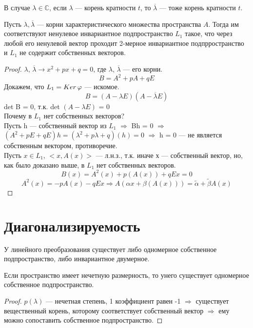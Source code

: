 В случае $\lambda \in \mathbb{C}$, если $\lambda$ --- корень кратности $t$, то $\overline{\lambda}$ --- тоже корень кратности $t$.

\begin{theorem}
    Пусть $\lambda, \overline{\lambda}$ --- корни характеристического множества пространства $A$. Тогда им соответствуют ненулевое инвариантное подпространство $L_1$ такое, что через любой его ненулевой вектор проходит 2-мерное инвариантное подпрространство и $L_1$ не содержит собственных векторов.
\end{theorem}
\begin{proof}
$\lambda$, $\overline{\lambda} \longrightarrow x^2 + px + q = 0$, где $\lambda$, $\overline{\lambda}$ --- его корни.\\
\[
B = A^2 + pA + qE
\]
Докажем, что $L_1 = Ker\thinspace\phi$ --- искомое.\\
\[
B = (A - \lambda E)(A - \overline{\lambda}E)
\]
det B = 0, т.к. det $(A - \lambda E)$ = 0\\
Почему в $L_1$ нет собственных векторов?\\
Пусть h --- собственный вектор из $L_1$ $\Longrightarrow$ Bh = 0 $\Longrightarrow$ $(A^2 + pE + qE)h = (\lambda^2 + p\lambda + q)(h) = 0$ $\Longrightarrow$ h = 0 --- не является собственным вектором, противоречие.\\
Пусть $x \in L_1$, $<x, A(x)>$ --- л.н.з., т.к. иначе х --- собственный вектор, но, как было доказано выше, в $L_1$ нет собственных векторов.
\[
B(x) = A^2(x) + p(A(x)) + qEx = 0
\]
\[
A^2(x) = -pA(x) - qEx \Longrightarrow A(\alpha x + \beta (A(x))) = \widetilde{\alpha} + \widetilde{\beta}A(x)
\]
\end{proof}









\section{Диагонализируемость}

\begin{proposition}
    У линейного преобразования существует либо одномерное собственное подпространство, либо инвариантное двумерное.
\end{proposition}

\begin{lemma}
    Если пространство имеет нечетную размерность, то унего существует одномерное собственное подпространство.
\end{lemma}
\begin{proof}
$p(\lambda)$ --- нечетная степень, 1 коэффициент равен -1 $\Longrightarrow$ существует вещественный корень, которому соответствует собственный вектор $\Longrightarrow$ ему можно сопоставить собственное подпространство.    
\end{proof}


